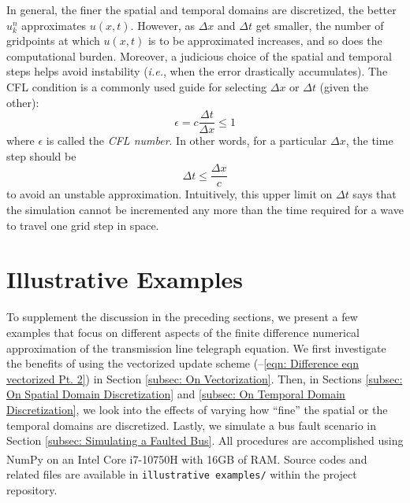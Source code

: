 \documentclass{article}
\begin{document}
In general, the finer the spatial and temporal domains are discretized, the better $u_{k}^{n}$ approximates $u \left(x,t\right)$.
However, as $\Delta x$ and $\Delta t$ get smaller, the number of gridpoints at which $u\left(x,t\right)$ is to be approximated increases,
and so does the computational burden.
Moreover, a judicious choice of the spatial and temporal steps helps avoid instability
(\textit{i.e.}, when the error drastically accumulates).
The CFL condition is a commonly used guide for selecting $\Delta x$ or $\Delta t$ (given the other):
\begin{equation}
   \label{eqn: CFL condition}
   \epsilon = c \frac{\Delta t}{\Delta x} \leq 1
\end{equation}
where $\epsilon$ is called the \textit{CFL number}.
In other words, for a particular $\Delta x$, the time step should be
\begin{equation*}
   \Delta t \leq \frac{\Delta x}{c}
\end{equation*}
to avoid an unstable approximation.
Intuitively, this upper limit on $\Delta t$ says that the simulation cannot be incremented any more than the time required
for a wave to travel one grid step in space.

\section{Illustrative Examples}
\label{sec: Illustrative Examples}

To supplement the discussion in the preceding sections, we present a few examples that focus on different aspects of
the finite difference numerical approximation of the transmission line telegraph equation.
We first investigate the benefits of using the vectorized update scheme
(--\ref{eqn: Difference eqn vectorized Pt. 2})
in Section \ref{subsec: On Vectorization}.
Then, in Sections \ref{subsec: On Spatial Domain Discretization} and \ref{subsec: On Temporal Domain Discretization},
we look into the effects of varying how ``fine'' the spatial or the temporal domains are discretized.
Lastly, we simulate a bus fault scenario in Section \ref{subsec: Simulating a Faulted Bus}.
All procedures are accomplished using NumPy \citep{NumPy2020} on an
Intel\textsuperscript{\textregistered} Core\textsuperscript{\texttrademark} i7-10750H with 16GB of RAM.
Source codes and related files are available in
{\tt illustrative examples/}
within the project repository.
\end{document}
